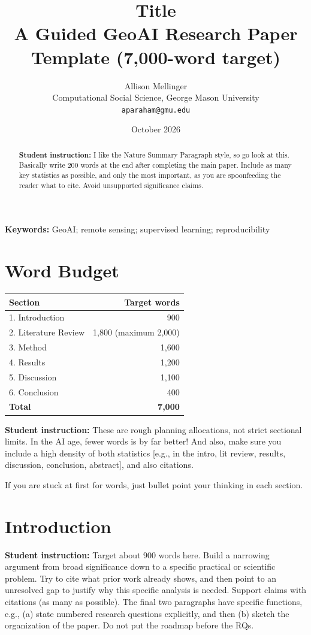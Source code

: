 \documentclass[11pt,letterpaper]{article}
\title{Title\\\large
A Guided GeoAI Research Paper Template (7,000-word target)}
\author{Allison Mellinger\\Computational Social Science, George Mason
University\\\texttt{aparaham@gmu.edu}}
\date{October 2026}
\newcommand{\guide}[1]{\par\begingroup\color{blue!60!black}\small\textbf{Student
instruction:} #1\par\endgroup}
\begin{document}
\maketitle
\begin{center}\end{center}
\begin{abstract}
\guide{I like the Nature Summary Paragraph style, so go look at this. 
Basically write 200 words at the end after completing the main paper. 
Include as many key statistics as possible, and only the most important, as you are spoonfeeding the reader what to cite. 
Avoid unsupported significance claims.}
\end{abstract}
\textbf{Keywords:} GeoAI; remote sensing; supervised learning; reproducibility
\section*{Word Budget}
\begin{center}\begin{tabular}{lr}\toprule Section & Target words \\\midrule
1. Introduction & 900\\
2. Literature Review & 1,800 (maximum 2,000)\\
3. Method & 1,600\\
4. Results & 1,200\\
5. Discussion & 1,100\\
6. Conclusion & 400\\\midrule
\textbf{Total} & \textbf{7,000}\\\bottomrule\end{tabular}\end{center}
\guide{These are rough planning allocations, not strict sectional limits. In the AI age, fewer words is by far better!
And also, make sure you include a high density of both statistics [e.g., in the intro, lit review, results, 
discussion, conclusion, abstract], and also citations. 

If you are stuck at first for words, just bullet point your thinking in each section.
}

\section{Introduction}
\guide{Target about 900 words here. Build a narrowing argument from broad significance
down to a specific practical or scientific problem. Try to cite what prior work already shows, and
then point to an unresolved gap to justify why this specific analysis is needed. Support
claims with citations (as many as possible). The final two paragraphs have specific functions, e.g., (a) state
numbered research questions explicitly, and then (b) sketch the organization of the paper. Do not
put the roadmap before the RQs.}
\end{document}
